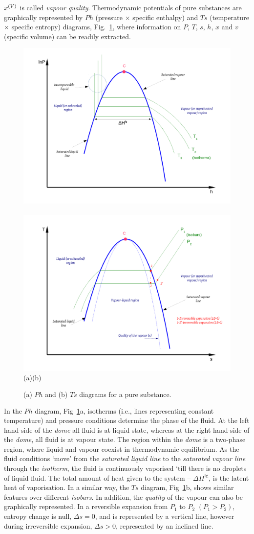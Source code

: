 $\mfr[x]{}{V}$ is called \underline{\it vapour quality}. Thermodynamic potentials of pure substances are graphically represented by $Ph$ (pressure $\times$ specific enthalpy) and $Ts$ (temperature $\times$ specific entropy) diagrams, Fig.~\ref{Mod03Fig02}, where information on $P$, $T$, $s$, $h$, $x$ and $v$ (specific volume) can be readily extracted.
%
           \begin{figure}[h]
              \vbox{
                    \hbox{\includegraphics[width=.5\columnwidth,clip]{./Figs/Mod3PHDiagram}
                          \includegraphics[width=.5\columnwidth,clip]{./Figs/Mod3TSDiagram}}
                    \vspace{-.1cm}
                    \hbox{\hspace{4cm}(a)\hspace{8cm}(b)}}
              \caption{ (a) $Ph$ and (b) $Ts$ diagrams for a pure substance.}\label{Mod03Fig02}
           \end{figure}
%
In the $Ph$ diagram, Fig~\ref{Mod03Fig02}a, isotherms (i.e., lines representing constant temperature) and pressure conditions determine the phase of the fluid. At the left hand-side of the {\it dome} all fluid is at liquid state, whereas at the right hand-side of the {\it dome}, all fluid is at vapour state. The region within the {\it dome} is a two-phase region, where liquid and vapour coexist in thermodynamic equilibrium. As the fluid conditions `move' from the {\it saturated liquid line} to the {\it saturated vapour line} through the {\it isotherm}, the fluid is continuously vaporised `till there is no droplets of liquid fluid. The total amount of heat given to the system -- $\Delta H^{\text{fg}}$, is the latent heat of vaporisation. In a similar way, the $Ts$ diagram, Fig~\ref{Mod03Fig02}b, shows similar features over different {\it isobars}. In addition, the {\it quality} of the vapour can also be graphically represented. In a reversible expansion from $P_{1}$ to $P_{2}$ $\left(P_{1}>P_{2}\right)$, entropy change is null, $\Delta s=0$, and is represented by a vertical line, however during irreversible expansion, $\Delta s >0$, represented by an inclined line.  

